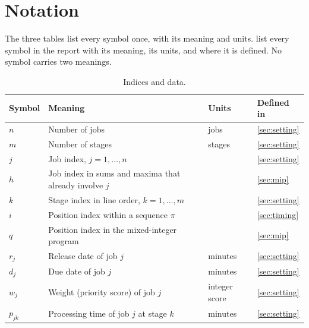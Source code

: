 \section{Notation}\label{sec:notation}

\sumpara The three tables list every symbol once, with its meaning and units. \sumparaend
\fin {} list every symbol in the report with its meaning, its units, and where it is defined. \fine
\fin No symbol carries two meanings. \fine

\begin{table}[!htbp]
\centering
\caption{Indices and data.}
\label{tab:notation-data}
\small
\begin{tabularx}{\textwidth}{lLll}
\toprule
Symbol & Meaning & Units & Defined in \\
\midrule
$n$ & Number of jobs & jobs & \cref{sec:setting} \\
$m$ & Number of stages & stages & \cref{sec:setting} \\
$j$ & Job index, $j = 1, \ldots, n$ & & \cref{sec:setting} \\
$h$ & Job index in sums and maxima that already involve $j$ & & \cref{sec:mip} \\
$k$ & Stage index in line order, $k = 1, \ldots, m$ & & \cref{sec:setting} \\
$i$ & Position index within a sequence $\pi$ & & \cref{sec:timing} \\
$q$ & Position index in the mixed-integer program & & \cref{sec:mip} \\
$r_j$ & Release date of job $j$ & minutes & \cref{sec:setting} \\
$d_j$ & Due date of job $j$ & minutes & \cref{sec:setting} \\
$w_j$ & Weight (priority score) of job $j$ & integer score & \cref{sec:setting} \\
$p_{jk}$ & Processing time of job $j$ at stage $k$ & minutes & \cref{sec:setting} \\
\bottomrule
\end{tabularx}
\end{table}

